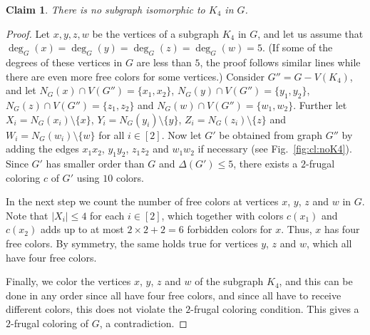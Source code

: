 \documentclass[10pt,a4paper]{article}
\newtheorem{claim}{Claim}
\begin{document}
\begin{claim} There is no subgraph isomorphic to $K_4$ in $G$.
\label{cl:noK4}
\end{claim} 
\begin{proof}
Let $x,y,z,w$ be the vertices of a subgraph $K_4$ in $G$, and let us assume that $\deg_G(x)=\deg_G(y)=\deg_G(z)=\deg_G(w)=5$. (If some of the degrees of these vertices in $G$ are less than $5$, the proof follows similar lines while there are even more free colors for some vertices.) Consider $G''=G-V(K_4)$, and let $N_G(x) \cap V(G'')=\{x_1,x_2\}$, $N_G(y) \cap V(G'')=\{y_1,y_2\}$, $N_G(z) \cap V(G'')=\{z_1,z_2\}$ and $N_G(w) \cap V(G'')=\{w_1,w_2\}$. Further let $X_i=N_G(x_i)\setminus\{x\}$, $Y_i=N_G(y_i)\setminus\{y\}$, $Z_i=N_G(z_i)\setminus\{z\}$ and $W_i=N_G(w_i)\setminus\{w\}$ for all $i \in [2]$. Now let $G'$ be obtained from graph $G''$ by adding the edges $x_1x_2$, $y_1y_2$, $z_1z_2$ and $w_1w_2$ if necessary (see Fig.~\ref{fig:cl:noK4}). %
Since $G'$ has smaller order than $G$ and $\Delta(G') \le 5$, there exists a $2$-frugal coloring $c$ of $G'$ using $10$ colors.

In the next step we count the number of free colors at vertices $x$, $y$, $z$ and $w$ in $G$. Note that $|X_i| \le 4$ for each $i\in [2]$, which together with colors $c(x_1)$ and $c(x_2)$ adds up to at most $2 \times 2 + 2=6$ forbidden colors for $x$. Thus, $x$ has four free colors. By symmetry, the same holds true for vertices $y$, $z$ and $w$, which all have four free colors.

Finally, we color the vertices $x$, $y$, $z$ and $w$ of the subgraph $K_4$, and this can be done in any order since all have four free colors, and since all have to receive different colors, this does not violate the $2$-frugal coloring condition. This gives a $2$-frugal coloring of $G$, a contradiction.
\end{proof}
\end{document}
